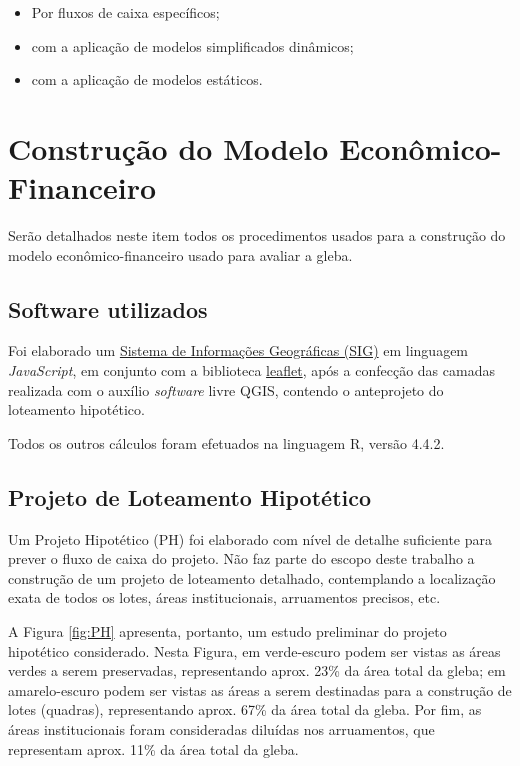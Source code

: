 \documentclass[
  10pt,
  a4paper]{article}
\providecommand{\tightlist}{%
  \setlength{\itemsep}{0pt}\setlength{\parskip}{0pt}}
\begin{document}
\begin{itemize}
\tightlist
\item
  Por fluxos de caixa específicos;
\item
  com a aplicação de modelos simplificados dinâmicos;
\item
  com a aplicação de modelos estáticos.
\end{itemize}

\section{Construção do Modelo
Econômico-Financeiro}\label{construuxe7uxe3o-do-modelo-econuxf4mico-financeiro}

Serão detalhados neste item todos os procedimentos usados para a
construção do modelo econômico-financeiro usado para avaliar a gleba.

\subsection{Software utilizados}\label{software-utilizados}

Foi elaborado um
\href{https://valoristica.github.io/PrimaveraLeste/}{Sistema de
Informações Geográficas (SIG)} em linguagem \emph{JavaScript}, em
conjunto com a biblioteca \href{https://leafletjs.com/}{leaflet}, após a
confecção das camadas realizada com o auxílio \emph{software} livre
QGIS, contendo o anteprojeto do loteamento hipotético.

Todos os outros cálculos foram efetuados na linguagem \textsf{R}, versão
4.4.2.

\subsection{Projeto de Loteamento
Hipotético}\label{projeto-de-loteamento-hipotuxe9tico}

Um Projeto Hipotético (PH) foi elaborado com nível de detalhe suficiente
para prever o fluxo de caixa do projeto. Não faz parte do escopo deste
trabalho a construção de um projeto de loteamento detalhado,
contemplando a localização exata de todos os lotes, áreas
institucionais, arruamentos precisos, etc.

A Figura \ref{fig:PH} apresenta, portanto, um estudo preliminar do
projeto hipotético considerado. Nesta Figura, em verde-escuro podem ser
vistas as áreas verdes a serem preservadas, representando aprox. 23\% da
área total da gleba; em amarelo-escuro podem ser vistas as áreas a serem
destinadas para a construção de lotes (quadras), representando aprox.
67\% da área total da gleba. Por fim, as áreas institucionais foram
consideradas diluídas nos arruamentos, que representam aprox. 11\% da
área total da gleba.
\end{document}
